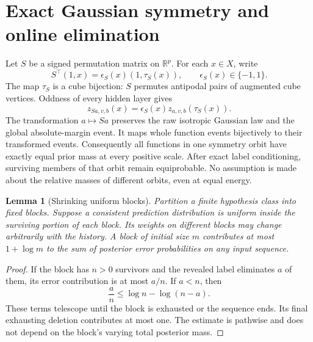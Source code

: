\documentclass[11pt]{article}
\newtheorem{lemma}[theorem]{Lemma}
\newcommand{\R}{\mathbb R}
\begin{document}
\section{Exact Gaussian symmetry and online elimination}
Let $S$ be a signed permutation matrix on $\R^p$. For each $x\in X$, write
\[
 S^\top(1,x)=\epsilon_S(x)(1,\tau_S(x)),\qquad
 \epsilon_S(x)\in\{-1,1\}.
\]
The map $\tau_S$ is a cube bijection: $S$ permutes antipodal pairs of augmented cube vertices. Oddness of every hidden layer gives
\[
 z_{Sa,v,b}(x)=\epsilon_S(x)z_{a,v,b}(\tau_S(x)).
\]
The transformation $a\mapsto Sa$ preserves the raw isotropic Gaussian law and the global absolute-margin event. It maps whole function events bijectively to their transformed events. Consequently all functions in one symmetry orbit have exactly equal prior mass at every positive scale. After exact label conditioning, surviving members of that orbit remain equiprobable. No assumption is made about the relative masses of different orbits, even at equal energy.

\begin{lemma}[Shrinking uniform blocks]\label{lem:blocks}
Partition a finite hypothesis class into fixed blocks. Suppose a consistent prediction distribution is uniform inside the surviving portion of each block. Its weights on different blocks may change arbitrarily with the history. A block of initial size $m$ contributes at most $1+\log m$ to the sum of posterior error probabilities on any input sequence.
\end{lemma}
\begin{proof}
If the block has $n>0$ survivors and the revealed label eliminates $a$ of them, its error contribution is at most $a/n$. If $a<n$, then
\[
 \frac an\le\log n-\log(n-a).
\]
These terms telescope until the block is exhausted or the sequence ends. Its final exhausting deletion contributes at most one. The estimate is pathwise and does not depend on the block's varying total posterior mass.
\end{proof}
\end{document}
